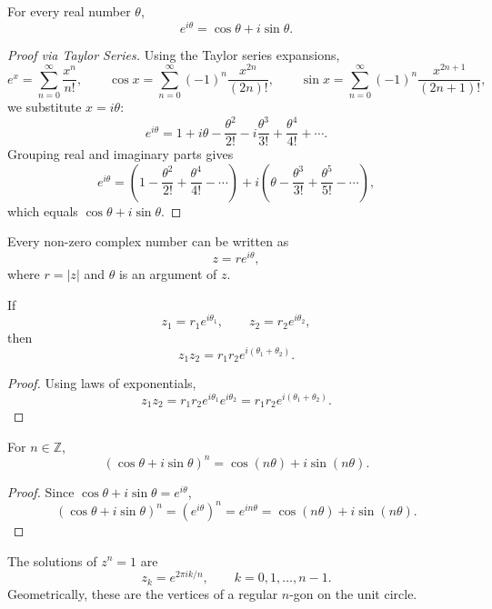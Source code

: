 \begin{theorem}
For every real number $\theta$,
\[
    e^{i\theta}=\cos\theta+i\sin\theta.
\]
\end{theorem}

\begin{proof}[Proof via Taylor Series]
Using the Taylor series expansions,
\[
    e^x=\sum_{n=0}^{\infty}\frac{x^n}{n!},
    \qquad
    \cos x=\sum_{n=0}^{\infty}(-1)^n\frac{x^{2n}}{(2n)!},
    \qquad
    \sin x=\sum_{n=0}^{\infty}(-1)^n\frac{x^{2n+1}}{(2n+1)!},
\]
we substitute $x=i\theta$:
\[
    e^{i\theta}=1+i\theta-\frac{\theta^2}{2!}-i\frac{\theta^3}{3!}+\frac{\theta^4}{4!}+\cdots.
\]
Grouping real and imaginary parts gives
\[
    e^{i\theta}=\left(1-\frac{\theta^2}{2!}+\frac{\theta^4}{4!}-\cdots\right)
    +i\left(\theta-\frac{\theta^3}{3!}+\frac{\theta^5}{5!}-\cdots\right),
\]
which equals $\cos\theta+i\sin\theta$.
\end{proof}

\begin{corollary}
Every non-zero complex number can be written as
\[
    z=re^{i\theta},
\]
where $r=|z|$ and $\theta$ is an argument of $z$.
\end{corollary}

\begin{proposition}
If
\[
    z_1=r_1e^{i\theta_1},
    \qquad
    z_2=r_2e^{i\theta_2},
\]
then
\[
    z_1z_2=r_1r_2e^{i(\theta_1+\theta_2)}.
\]
\end{proposition}

\begin{proof}
Using laws of exponentials,
\[
    z_1z_2=r_1r_2e^{i\theta_1}e^{i\theta_2}=r_1r_2e^{i(\theta_1+\theta_2)}.
\]
\end{proof}

\begin{theorem}
For $n\in\mathbb{Z}$,
\[
    (\cos\theta+i\sin\theta)^n=\cos(n\theta)+i\sin(n\theta).
\]
\end{theorem}

\begin{proof}
Since $\cos\theta+i\sin\theta=e^{i\theta}$,
\[
    (\cos\theta+i\sin\theta)^n=(e^{i\theta})^n=e^{in\theta}=\cos(n\theta)+i\sin(n\theta).
\]
\end{proof}

\begin{example}
The solutions of $z^n=1$ are
\[
    z_k=e^{2\pi i k/n},\qquad k=0,1,\dots,n-1.
\]
Geometrically, these are the vertices of a regular $n$-gon on the unit circle.
\end{example}

